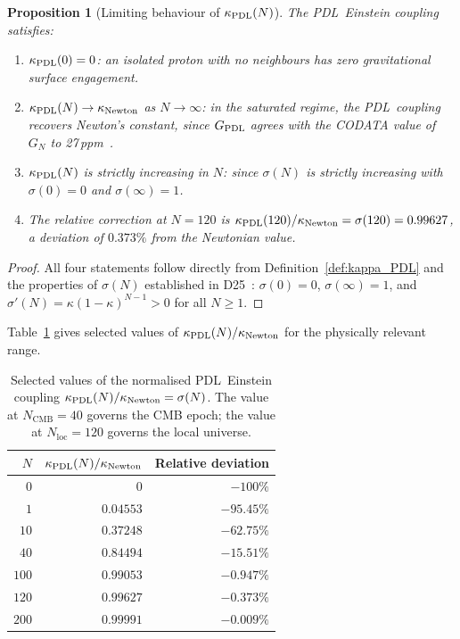 \documentclass[11pt,a4paper]{article}
\newtheorem{proposition}[theorem]{Proposition}
\theoremstyle{definition}
\newcommand{\PDL}{\textnormal{PDL}}
\newcommand{\GPDL}{G_{\PDL}}
\newcommand{\sig}{\sigma}
\newcommand{\kap}{\kappa}
\newcommand{\kPDL}{\kappa_{\PDL}}
\begin{document}
\begin{proposition}[Limiting behaviour of $\kPDL(N)$]
\label{prop:limits}
The \PDL\ Einstein coupling satisfies:
\begin{enumerate}[label=(\roman*)]
\item $\kPDL(0) = 0$: an isolated proton with no neighbours has zero gravitational surface engagement.
\item $\kPDL(N) \to \kappa_{\mathrm{Newton}}$ as $N \to \infty$: in the saturated regime, the \PDL\ coupling recovers Newton's constant, since $\GPDL$ agrees with the CODATA value of $G_N$ to 27\,ppm~\cite{Bridge_PDL_2026}.
\item $\kPDL(N)$ is strictly increasing in $N$: since $\sig(N)$ is strictly increasing with $\sig(0) = 0$ and $\sig(\infty) = 1$.
\item The relative correction at $N = 120$ is $\kPDL(120)/\kappa_{\mathrm{Newton}} = \sig(120) = 0.99627$, a deviation of $0.373\%$ from the Newtonian value.
\end{enumerate}
\end{proposition}

\begin{proof}
All four statements follow directly from Definition~\ref{def:kappa_PDL} and the properties of $\sig(N)$ established in D25~\cite{Effective_Sigma_PDL_2026}: $\sig(0) = 0$, $\sig(\infty) = 1$, and $\sig'(N) = \kap(1-\kap)^{N-1} > 0$ for all $N \geq 1$.
\end{proof}

Table~\ref{tab:kappa} gives selected values of $\kPDL(N)/\kappa_{\mathrm{Newton}}$ for the physically relevant range.

\begin{table}[ht]
\centering
\caption{Selected values of the normalised \PDL\ Einstein coupling $\kPDL(N)/\kappa_{\mathrm{Newton}} = \sig(N)$. The value at $N_{\mathrm{CMB}} = 40$ governs the CMB epoch; the value at $N_{\mathrm{loc}} = 120$ governs the local universe.}
\label{tab:kappa}
\begin{tabular}{rrr}
\toprule
$N$ & $\kPDL(N)/\kappa_{\mathrm{Newton}}$ & Relative deviation \\
\midrule
$0$ & $0$ & $-100\%$ \\
$1$ & $0.04553$ & $-95.45\%$ \\
$10$ & $0.37248$ & $-62.75\%$ \\
$40$ & $0.84494$ & $-15.51\%$ \\
$100$ & $0.99053$ & $-0.947\%$ \\
$120$ & $0.99627$ & $-0.373\%$ \\
$200$ & $0.99991$ & $-0.009\%$ \\
\bottomrule
\end{tabular}
\end{table}
\end{document}
